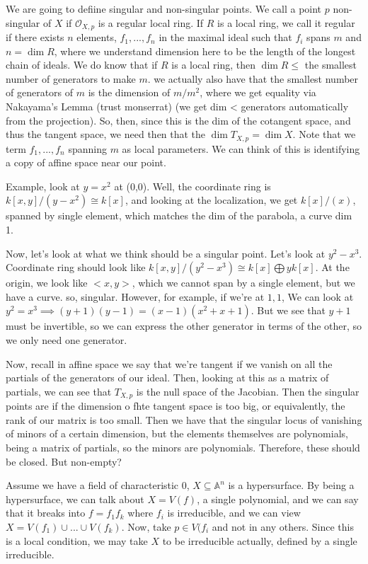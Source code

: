 \documentclass[10pt]{article}
\begin{document}
We are going to defiine singular and non-singular points. We call a point $p$ non-singular of $X$ if $\mathcal{O}_{X,p}$ is a regular local ring. If $R$ is a local ring, we call it regular if there exists $n$ elements, $f_1,...,f_n$ in the maximal ideal such that $f_i$ spans $m$ and $n = \dim R$, where we understand dimension here to be the length of the longest chain of ideals. We do know that if $R$ is a local ring, then $\dim R \leq $ the smallest number of generators to make $m$. we actually also have that the smallest number of generators of $m$ is the dimension of $m/m^2$, where we get equality via Nakayama’s Lemma (trust monserrat) (we get dim < generators automatically from the projection). So, then, since this is the dim of the cotangent space, and thus the tangent space, we need then that the $\dim T_{X,p} = \dim X$. Note that we term $f_1,...,f_n$ spanning $m$ as local parameters. We can think of this is identifying a copy of affine space near our point.

Example, look at $y = x^2$ at (0,0). Well, the coordinate ring is $k[x,y]/(y-x^2) \cong k[x]$, and looking at the localization, we get $k[x]/(x)$, spanned by single element, which matches the dim of the parabola, a curve dim 1.

Now, let’s look at what we think should be a singular point. Let’s look at $ y^2 - x^3$. Coordinate ring should look like $k[x,y]/(y^2 - x^3) \cong k[x]  \bigoplus y k[x]$. At the origin, we look like $<x,y>$, which we cannot span by a single element, but we have a curve. so, singular. However, for example, if we’re at $1,1$, We can look at $y^2 = x^3 \implies (y+1)(y-1) = (x-1) (x^2 + x + 1)$. But we see that $y + 1$ must be invertible, so we can express the other generator in terms of the other, so we only need one generator.

Now, recall in affine space we say that we’re tangent if we vanish on all the partials of the generators of our ideal. Then, looking at this as a matrix of partials, we can see that $T_{X,p}$ is the null space of the Jacobian. Then the singular points are if the dimension o fhte tangent space is too big, or equivalently, the rank of our matrix is too small. Then we have that the singular locus of vanishing of minors of a certain dimension, but the elements themselves are polynomials, being a matrix of partials, so the minors are polynomials. Therefore, these should be closed. But non-empty?

Assume we have a field of characteristic 0, $X \subseteq \mathbb{A}^n$ is a hypersurface. By being a hypersurface, we can talk about $X = V(f)$, a single polynomial, and we can say that it breaks into $f = f_1f_k$ where $f_i$ is irreducible, and we can view $X = V(f_1) \cup ... \cup V(f_k)$. Now, take $p \in V(f_i$ and not in any others. Since this is a local condition, we may take $X$ to be irreducible actually, defined by a single irreducible. 
\end{document}
